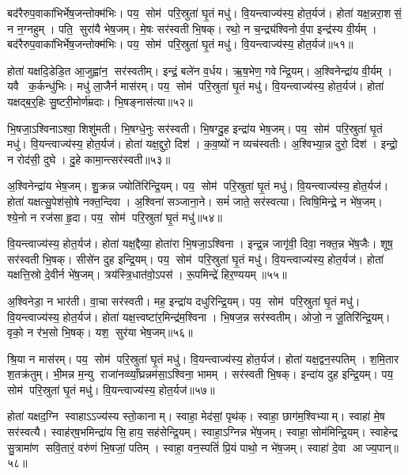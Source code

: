बद॑रैरुप॒वाका॑भिर्भेष॒जन्तोक्म॑भिः। पय॒ सोम॑ परि॒स्रुता॑ घृ॒तं मधु॑। वि॒यन्त्वाज्य॑स्य॒ होत॒र्यज॑। होता॑ यक्ष॒न्नरा॒शसं॒ न न॒ग्नहुम्। पति॒ सुरा॑यै भेष॒जम्। मे॒षः सर॑स्वती भि॒षक्। रथो॒ न च॒न्द्र्य॑श्विनोर्व॒पा इन्द्र॑स्य वी॒र्यम्। बद॑रैरुप॒वाका॑भिर्भेष॒जन्तोक्म॑भिः। पय॒ सोम॑ परि॒स्रुता॑ घृ॒तं मधु॑। वि॒यन्त्वाज्य॑स्य॒ होत॒र्यज॑॥५१॥

होता॑ यक्षदि॒डेडि॒त आ॒जुह्वा॑न॒ सर॑स्वतीम्। इन्द्रं॒ बले॑न व॒र्धय\sn{}। ऋ॒ष॒भेण॒ गवेन्द्रि॒यम्। अ॒श्विनेन्द्रा॑य वी॒र्यम्। यवै क॒र्कन्धु॑भिः। मधु॑ ला॒जैर्न मास॑रम्। पय॒ सोम॑ परि॒स्रुता॑ घृ॒तं मधु॑। वि॒यन्त्वाज्य॑स्य॒ होत॒र्यज॑। होता॑ यक्षद्ब॒र्॒हिः सु॒ष्टरी॒मोर्ण॑म्रदाः। भि॒षङ्नास॑त्या॥५२॥

भि॒षजा॒ऽश्विनाऽश्वा॒ शिशु॑मती। भि॒षग्धे॒नुः सर॑स्वती। भि॒षग्दु॒ह इन्द्रा॑य भेष॒जम्। पय॒ सोम॑ परि॒स्रुता॑ घृ॒तं मधु॑। वि॒यन्त्वाज्य॑स्य॒ होत॒र्यज॑। होता॑ यक्ष॒द्दुरो॒ दिश॑। क॒व॒ष्यो॑ न व्यच॑स्वतीः। अ॒श्विभ्या॒न्न दुरो॒ दिश॑। इन्द्रो॒ न रोद॑सी॒ दुघे। दु॒हे कामा॒न्त्सर॑स्वती॥५३॥

अ॒श्विनेन्द्रा॑य भेष॒जम्। शु॒क्रन्न ज्योति॑रिन्द्रि॒यम्। पय॒ सोम॑ परि॒स्रुता॑ घृ॒तं मधु॑। वि॒यन्त्वाज्य॑स्य॒ होत॒र्यज॑। होता॑ यक्षत्सु॒पेश॑सो॒षे नक्त॒न्दिवा। अ॒श्विना॑ सञ्जाना॒ने। समं॑ जाते॒ सर॑स्वत्या। त्विषि॒मिन्द्रे॒ न भे॑ष॒जम्। श्ये॒नो न रज॑सा हृ॒दा। पय॒ सोम॑ परि॒स्रुता॑ घृ॒तं मधु॑॥५४॥

वि॒यन्त्वाज्य॑स्य॒ होत॒र्यज॑। होता॑ यक्ष॒द्दैव्या॒ होता॑रा भि॒षजा॒ऽश्विना। इन्द्र॒न्न जागृ॑वी॒ दिवा॒ नक्त॒न्न भे॑ष॒जैः। शूष॒ सर॑स्वती भि॒षक्। सीसे॑न दुह इन्द्रि॒यम्। पय॒ सोम॑ परि॒स्रुता॑ घृ॒तं मधु॑। वि॒यन्त्वाज्य॑स्य॒ होत॒र्यज॑। होता॑ यक्षत्ति॒स्रो दे॒वीर्न भे॑ष॒जम्। त्रय॑स्त्रि॒धात॑वो॒ऽपस॑। रू॒पमिन्द्रे॑ हिर॒ण्ययम्॥५५॥

अ॒श्विनेडा॒ न भार॑ती। वा॒चा सर॑स्वती। मह॒ इन्द्रा॑य दधुरिन्द्रि॒यम्। पय॒ सोम॑ परि॒स्रुता॑ घृ॒तं मधु॑। वि॒यन्त्वाज्य॑स्य॒ होत॒र्यज॑। होता॑ यक्ष॒त्त्वष्टा॑र॒मिन्द्र॑म॒श्विना। भि॒षज॒न्न सर॑स्वतीम्। ओजो॒ न जू॒तिरि॑न्द्रि॒यम्। वृको॒ न र॑भ॒सो भि॒षक्। यश॒ सुर॑या भेष॒जम्॥५६॥

श्रि॒या न मास॑रम्। पय॒ सोम॑ परि॒स्रुता॑ घृ॒तं मधु॑। वि॒यन्त्वाज्य॑स्य॒ होत॒र्यज॑। होता॑ यक्ष॒द्वन॒स्पतिम्। श॒मि॒तार श॒तक्र॑तुम्। भी॒मन्न म॒न्यु राजा॑नव्व्याँ॒घ्रन्नम॑सा॒ऽश्विना॒ भामम्। सर॑स्वती भि॒षक्। इन्दा॑य दुह इन्द्रि॒यम्। पय॒ सोम॑ परि॒स्रुता॑ घृ॒तं मधु॑। वि॒यन्त्वाज्य॑स्य॒ होत॒र्यज॑॥५७॥

होता॑ यक्षद॒ग्नि स्वाहाऽऽज्य॑स्य स्तो॒कानाम्। स्वाहा॒ मेद॑सां॒ पृथ॑क्। स्वाहा॒ छाग॑म॒श्विभ्याम्। स्वाहा॑ मे॒ष सर॑स्वत्यै। स्वाह॑र्‌ष॒भमिन्द्रा॑य सि॒हाय॒ सह॑सेन्द्रि॒यम्। स्वाहा॒ऽग्निन्न भे॑ष॒जम्। स्वाहा॒ सोम॑मिन्द्रि॒यम्। स्वाहेन्द्र सु॒त्रामा॑ण सवि॒तारं॒ वरु॑णं भि॒षजां॒ पतिम्। स्वाहा॒ वन॒स्पतिं॑ प्रि॒यं पाथो॒ न भे॑ष॒जम्। स्वाहा॑ दे॒वा आज्य॒पान्॥५८॥

